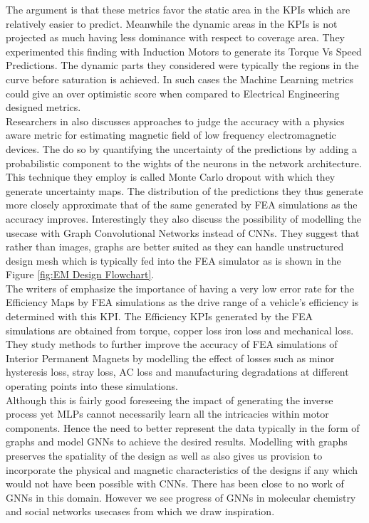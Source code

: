 \documentclass{report} %
\begin{document}
The argument is that these metrics favor the static area in the \ac{KPI}s which are relatively easier to predict.
Meanwhile the dynamic areas in the \ac{KPI}s is not projected as much having less dominance with respect to coverage area.
They experimented this finding with Induction Motors to generate its Torque Vs Speed Predictions. The dynamic parts they considered 
were typically the regions in the curve before saturation is achieved. 
In such cases the Machine Learning metrics could give an over optimistic score when compared to Electrical Engineering designed metrics.\\
Researchers in \cite{DL-MF-2019} also discusses approaches to judge the accuracy with a physics aware metric for estimating 
magnetic field of low frequency electromagnetic devices. The do so by quantifying the uncertainty of the predictions by adding 
a probabilistic component to the wights of the neurons in the network architecture. This technique they employ is called Monte Carlo dropout 
with which they generate uncertainty maps. 
The distribution of the predictions they thus generate more closely approximate that of the same generated by \ac{FEA} simulations as the accuracy improves.
Interestingly they also discuss the possibility of modelling the usecase with Graph Convolutional Networks instead of \ac{CNN}s.
They suggest that rather than images, graphs are better suited as they can handle unstructured design mesh which is 
typically fed into the \ac{FEA} simulator as is shown in the Figure \ref{fig:EM Design Flowchart}.\\
The writers of \cite{ETA-LA-2020} emphasize the importance of having a very low error rate for the Efficiency Maps by \ac{FEA} simulations 
as the drive range of a vehicle's efficiency is determined with this \ac{KPI}. 
The Efficiency \ac{KPI}s generated by the \ac{FEA} simulations are obtained from torque, copper loss iron loss and mechanical loss.
They study methods to further improve the accuracy of \ac{FEA} simulations of Interior Permanent Magnets by modelling the effect 
of losses such as minor hysteresis loss, stray loss, AC loss and manufacturing degradations at different operating points into these simulations.\\
Although this is fairly good foreseeing the impact of generating the inverse process yet \ac{MLP}s cannot necessarily learn all the intricacies within motor components.
Hence the need to better represent the data typically in the form of graphs and model \ac{GNN}s to achieve the desired results. 
Modelling with graphs preserves the spatiality of the design as well as also gives us provision to incorporate the physical and magnetic 
characteristics of the designs if any which would not have been possible with \ac{CNN}s.
There has been close to no work of \ac{GNN}s in this domain. 
However we see progress of \ac{GNN}s in molecular chemistry and social networks usecases from which we draw inspiration.
\end{document}
